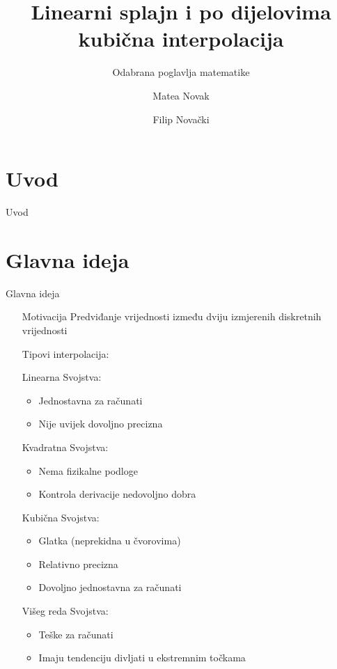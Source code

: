 \documentclass[10pt]{beamer}
\begin{document}
	\author{Matea Novak \and Filip Novački}
	\title{Linearni splajn i po dijelovima kubična interpolacija}
	\subtitle{Odabrana poglavlja matematike}
	\institute{}

	\begin{frame}[plain]
	\maketitle
\end{frame}
\tableofcontents
\section{Uvod}
\begin{frame}{Uvod}

\end{frame}
\section{Glavna ideja}
	\begin{frame}{Glavna ideja}
		\begin{itemize}
			\item[Motivacija ] Predviđanje vrijednosti između dviju izmjerenih diskretnih vrijednosti
			\pause
			\item[Tipovi interpolacija: ] 
			\item[Linearna ] Svojstva:
			\begin{itemize}
				\item Jednostavna za računati
				\item Nije uvijek dovoljno precizna
			\end{itemize}
		
			\item[Kvadratna ] Svojstva:
			\begin{itemize}
				\item Nema fizikalne podloge
				\item Kontrola derivacije nedovoljno dobra
			\end{itemize}
			\item[Kubična ] Svojstva:
			\begin{itemize}
				\item Glatka (neprekidna u čvorovima)
				\item Relativno precizna
				\item Dovoljno jednostavna za računati
			\end{itemize}
			\item[Višeg reda ] Svojstva:
			\begin{itemize}
				\item Teške za računati
				\item Imaju tendenciju divljati u ekstremnim točkama
			\end{itemize}
		\end{itemize}
	\end{frame}
\end{document}
